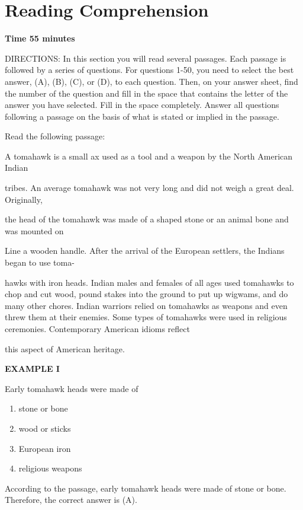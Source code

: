 \documentclass[12pt]{article}
\begin{document}
\section*{Reading Comprehension}
\begin{center}
\textbf{Time 55 minutes}
\end{center}
DIRECTIONS: In this section you will read several passages. Each passage is followed by a series of questions. For questions 1-50, you need to select the best answer, (A), (B), (C), or (D), to each question. Then, on your answer sheet, find the number of the question and fill in the space that contains the letter of the answer you have selected. Fill in the space completely. Answer all questions following a passage on the basis of what is stated or implied in the passage.\par
\begin{exampleblock}
\small
\sloppy
Read the following passage:\par
A tomahawk is a small ax used as a tool and a weapon by the North American Indian\par
tribes. An average tomahawk was not very long and did not weigh a great deal. Originally,\par
the head of the tomahawk was made of a shaped stone or an animal bone and was mounted on\par
Line a wooden handle. After the arrival of the European settlers, the Indians began to use toma-\par
hawks with iron heads. Indian males and females of all ages used tomahawks to chop and cut wood, pound stakes into the ground to put up wigwams, and do many other chores. Indian warriors relied on tomahawks as weapons and even threw them at their enemies. Some types of tomahawks were used in religious ceremonies. Contemporary American idioms reflect\par
this aspect of American heritage.\par
\end{exampleblock}
\begin{exampleblock}
\textbf{EXAMPLE I}\par
\noindent Early tomahawk heads were made of
\begin{enumerate}[label=(\Alph*),leftmargin=*,itemsep=0.2em]
\item stone or bone
\item wood or sticks
\item European iron
\item religious weapons
\end{enumerate}
\vspace{0.25\baselineskip}
According to the passage, early tomahawk heads were made of stone or bone. Therefore, the correct answer is (A).\par
\end{exampleblock}
\end{document}
